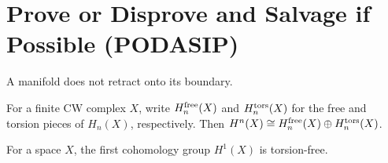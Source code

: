 \documentclass{homework}
\begin{document}
\section{Prove or Disprove and Salvage if Possible (PODASIP)}

\begin{problem}
  A manifold does not retract onto its boundary.
\end{problem}

\begin{problem}
  For a finite CW complex $X$, write
  $H^{\mbox{\scriptsize free}}_n(X)$ and 
  $H^{\mbox{\scriptsize tors}}_n(X)$ for the free and torsion pieces of $H_n(X)$, respectively.
  Then $H^n(X) \cong  
  H^{\mbox{\scriptsize free}}_n(X) \oplus
  H^{\mbox{\scriptsize tors}}_n(X)$.
\end{problem}

\begin{problem}
  For a space $X$, the first cohomology group $H^1(X)$ is torsion-free.
  \end{problem}
\end{document}
